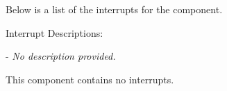 \par Below is a list of the interrupts for the  component.

Interrupt Descriptions:
\begin{spaceditemize}
  \item \textbf{\texttt{}} - 
    \textit{No description provided.}
\end{spaceditemize}
\vspace{5mm} %
This component contains no interrupts.
